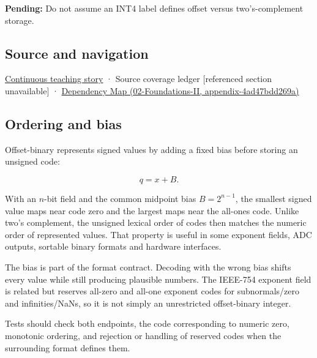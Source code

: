 \textbf{Pending:} Do not assume an INT4 label defines offset versus two's-complement storage.

\subsection{Source and navigation}\label{appendix-53a8cfb25f8d-source-and-navigation}

\hyperref[01-foundations-i-ch001-choosing-what-information-to-keep]{Continuous teaching story} · {Source coverage ledger {[}referenced section unavailable{]}} · \href{../02-Foundations-II/main.pdf\#nameddest=appendix-4ad47bdd269a}{Dependency Map (02-Foundations-II, appendix-4ad47bdd269a)}

\subsection{Ordering and bias}\label{appendix-53a8cfb25f8d-ordering-and-bias}

Offset-binary represents signed values by adding a fixed bias before storing an unsigned code:

\[q=x+B.\]

With an \(n\)-bit field and the common midpoint bias \(B=2^{n-1}\), the smallest signed value maps near code zero and the largest maps near the all-ones code. Unlike two's complement, the unsigned lexical order of codes then matches the numeric order of represented values. That property is useful in some exponent fields, ADC outputs, sortable binary formats and hardware interfaces.

The bias is part of the format contract. Decoding with the wrong bias shifts every value while still producing plausible numbers. The IEEE-754 exponent field is related but reserves all-zero and all-one exponent codes for subnormals/zero and infinities/NaNs, so it is not simply an unrestricted offset-binary integer.

Tests should check both endpoints, the code corresponding to numeric zero, monotonic ordering, and rejection or handling of reserved codes when the surrounding format defines them.
